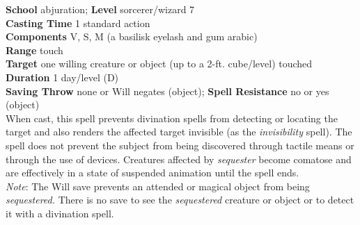 \textbf{School} abjuration; \textbf{Level} sorcerer/wizard 7\\
\textbf{Casting Time} 1 standard action\\
\textbf{Components} V, S, M (a basilisk eyelash and gum arabic)\\
\textbf{Range} touch\\
\textbf{Target} one willing creature or object (up to a 2-ft. cube/level) touched\\
\textbf{Duration} 1 day/level (D)\\
\textbf{Saving Throw} none or Will negates (object); \textbf{Spell Resistance} no or yes (object)\\
When cast, this spell prevents divination spells from detecting or locating the target and also renders the affected target invisible (as the \textit{invisibility }spell). The spell does not prevent the subject from being discovered through tactile means or through the use of devices. Creatures affected by \textit{sequester }become comatose and are effectively in a state of suspended animation until the spell ends.\\
\textit{Note}: The Will save prevents an attended or magical object from being \textit{sequestered. }There is no save to see the \textit{sequestered }creature or object or to detect it with a divination spell.\\
